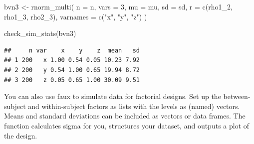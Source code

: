 \documentclass[
  oneside]{book}
\newenvironment{Shaded}{\begin{snugshade}}{\end{snugshade}}
\newcommand{\AttributeTok}[1]{\textcolor[rgb]{0.77,0.63,0.00}{#1}}
\newcommand{\DecValTok}[1]{\textcolor[rgb]{0.00,0.00,0.81}{#1}}
\newcommand{\FunctionTok}[1]{\textcolor[rgb]{0.00,0.00,0.00}{#1}}
\newcommand{\NormalTok}[1]{#1}
\newcommand{\OtherTok}[1]{\textcolor[rgb]{0.56,0.35,0.01}{#1}}
\newcommand{\SpecialCharTok}[1]{\textcolor[rgb]{0.00,0.00,0.00}{#1}}
\newcommand{\StringTok}[1]{\textcolor[rgb]{0.31,0.60,0.02}{#1}}
\begin{document}
\begin{Shaded}
\begin{Highlighting}[]
\NormalTok{bvn3 }\OtherTok{\textless{}{-}} \FunctionTok{rnorm\_multi}\NormalTok{(}
  \AttributeTok{n =}\NormalTok{ n, }
  \AttributeTok{vars =} \DecValTok{3}\NormalTok{,}
  \AttributeTok{mu =}\NormalTok{ mu, }
  \AttributeTok{sd =}\NormalTok{ sd,}
  \AttributeTok{r =} \FunctionTok{c}\NormalTok{(rho1\_2, rho1\_3, rho2\_3),}
  \AttributeTok{varnames =} \FunctionTok{c}\NormalTok{(}\StringTok{"x"}\NormalTok{, }\StringTok{"y"}\NormalTok{, }\StringTok{"z"}\NormalTok{)}
\NormalTok{)}

\FunctionTok{check\_sim\_stats}\NormalTok{(bvn3)}
\end{Highlighting}
\end{Shaded}

\begin{verbatim}
##     n var    x    y    z  mean   sd
## 1 200   x 1.00 0.54 0.05 10.23 7.92
## 2 200   y 0.54 1.00 0.65 19.94 8.72
## 3 200   z 0.05 0.65 1.00 30.09 9.51
\end{verbatim}

You can also use faux to simulate data for factorial designs. Set up the between-subject and within-subject factors as lists with the levels as (named) vectors. Means and standard deviations can be included as vectors or data frames. The function calculates sigma for you, structures your dataset, and outputs a plot of the design.

\begin{Shaded}
\end{Shaded}
\end{document}
